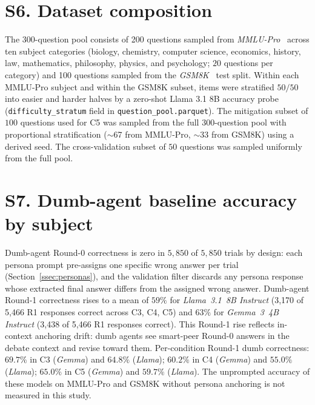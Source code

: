 \documentclass[11pt]{article}
\begin{document}
\section*{S6. Dataset composition}
\label{ssec:dataset}

The 300-question pool consists of 200 questions sampled from
\textit{MMLU-Pro}~\citep{wang2024mmlupro} across ten subject categories
(biology, chemistry, computer science, economics, history, law,
mathematics, philosophy, physics, and psychology; $20$ questions per
category) and 100 questions sampled from the
\textit{GSM8K}~\citep{cobbe2021training} test split.
Within each MMLU-Pro subject and within the GSM8K subset, items were
stratified $50/50$ into easier and harder halves by a zero-shot Llama
3.1 8B accuracy probe (\texttt{difficulty\_stratum} field in
\texttt{question\_pool.parquet}).
The mitigation subset of $100$ questions used for C5 was sampled from
the full $300$-question pool with proportional stratification
($\sim$67 from MMLU-Pro, $\sim$33 from GSM8K) using a derived seed.
The cross-validation subset of $50$ questions was sampled uniformly
from the full pool.

\section*{S7. Dumb-agent baseline accuracy by subject}
\label{ssec:dumbbaseline}

Dumb-agent Round-0 correctness is zero in $5{,}850$ of $5{,}850$
trials by design: each persona prompt pre-assigns one specific wrong
answer per trial (Section~\ref{ssec:personas}), and the validation
filter discards any persona response whose extracted final answer
differs from the assigned wrong answer.
Dumb-agent Round-1 correctness rises to a mean of $59\%$ for
\textit{Llama~3.1~8B Instruct} (3{,}170 of 5{,}466 R1 responses
correct across C3, C4, C5) and $63\%$ for \textit{Gemma~3~4B Instruct}
(3{,}438 of 5{,}466 R1 responses correct).
This Round-1 rise reflects in-context anchoring drift: dumb agents
see smart-peer Round-0 answers in the debate context and revise
toward them.
Per-condition Round-1 dumb correctness: $69.7\%$ in C3
(\textit{Gemma}) and $64.8\%$ (\textit{Llama}); $60.2\%$ in C4
(\textit{Gemma}) and $55.0\%$ (\textit{Llama}); $65.0\%$ in C5
(\textit{Gemma}) and $59.7\%$ (\textit{Llama}).
The unprompted accuracy of these models on MMLU-Pro and GSM8K
without persona anchoring is not measured in this study.
\end{document}
